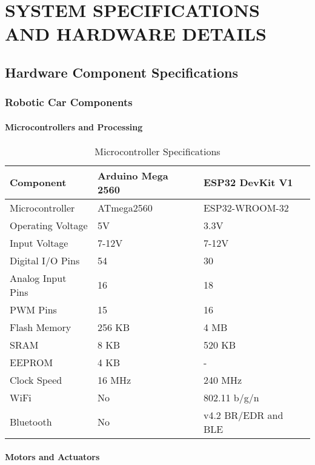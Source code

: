 \chapter{SYSTEM SPECIFICATIONS AND HARDWARE DETAILS}

\section{Hardware Component Specifications}

\subsection{Robotic Car Components}

\subsubsection{Microcontrollers and Processing}

\begin{table}[H]
\centering
\caption{Microcontroller Specifications}
\begin{tabular}{|l|l|l|}
\hline
\textbf{Component} & \textbf{Arduino Mega 2560} & \textbf{ESP32 DevKit V1} \\
\hline
Microcontroller & ATmega2560 & ESP32-WROOM-32 \\
Operating Voltage & 5V & 3.3V \\
Input Voltage & 7-12V & 7-12V \\
Digital I/O Pins & 54 & 30 \\
Analog Input Pins & 16 & 18 \\
PWM Pins & 15 & 16 \\
Flash Memory & 256 KB & 4 MB \\
SRAM & 8 KB & 520 KB \\
EEPROM & 4 KB & - \\
Clock Speed & 16 MHz & 240 MHz \\
WiFi & No & 802.11 b/g/n \\
Bluetooth & No & v4.2 BR/EDR and BLE \\
\hline
\end{tabular}
\label{tab:microcontrollers}
\end{table}

\subsubsection{Motors and Actuators}


